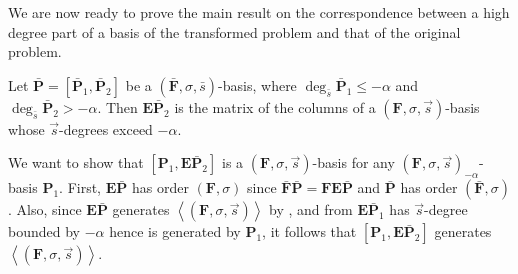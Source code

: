 We are now ready to prove the main result on the correspondence between
a high degree part of a basis of the transformed problem and that
of the original problem. 
\begin{thm}
\label{thm:correctHighDegreeElements}Let $\bar{\mathbf{P}}=[\bar{\mathbf{P}}_{1},\bar{\mathbf{P}}_{2}]$
be a $\left(\bar{\mathbf{F}},\sigma,\bar{s}\right)$-basis, where
$\deg_{\bar{s}}\bar{\mathbf{P}}_{1}\le-\alpha$ and $\deg_{\bar{s}}\bar{\mathbf{P}}_{2}>-\alpha$.
Then $\mathbf{E}\bar{\mathbf{P}}_{2}$ is the matrix of the columns
of a $\left(\mathbf{F},\sigma,\vec{s}\right)$-basis whose $\vec{s}$-degrees
exceed $-\alpha$. \end{thm}
\begin{pf}
We want to show that $[\mathbf{P}_{1},\mathbf{E}\bar{\mathbf{P}}_{2}]$
is a $\left(\mathbf{F},\sigma,\vec{s}\right)$-basis for any $\left(\mathbf{F},\sigma,\vec{s}\right)_{-\alpha}$-basis
$\mathbf{P}_{1}$. First, $\mathbf{E}\bar{\mathbf{P}}$ has order
$(\mathbf{F},\sigma)$ since $\bar{\mathbf{F}}\bar{\mathbf{P}}=\mathbf{F}\mathbf{E}\bar{\mathbf{P}}$
and $\bar{\mathbf{P}}$ has order $\left(\bar{\mathbf{F}},\sigma\right)$.
Also, since $\mathbf{E}\bar{\mathbf{P}}$ generates $\left\langle \left(\mathbf{F},\sigma,\vec{s}\right)\right\rangle $
by , and from 
$\mathbf{E}\bar{\mathbf{P}}_{1}$ has $\vec{s}$-degree bounded by
$-\alpha$ hence is generated by $\mathbf{P}_{1}$, it follows that
$\left[\mathbf{P}_{1},\mathbf{E}\bar{\mathbf{P}}_{2}\right]$ generates
$\left\langle \left(\mathbf{F},\sigma,\vec{s}\right)\right\rangle $.


\end{pf}
